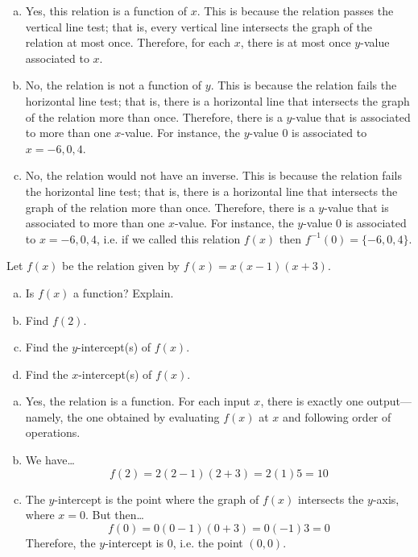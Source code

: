 \documentclass[12pt,letterpaper]{exam}
\begin{document}
\begin{questions}
\sol 
\begin{enumerate}[(a)]
\item Yes, this relation is a function of $x$. This is because the relation passes the vertical line test; that is, every vertical line intersects the graph of the relation at most once. Therefore, for each $x$, there is at most once $y$-value associated to $x$. \pspace

\item No, the relation is not a function of $y$. This is because the relation fails the horizontal line test; that is, there is a horizontal line that intersects the graph of the relation more than once. Therefore, there is a $y$-value that is associated to more than one $x$-value. For instance, the $y$-value $0$ is associated to $x= -6, 0, 4$. \pspace

\item No, the relation would not have an inverse. This is because the relation fails the horizontal line test; that is, there is a horizontal line that intersects the graph of the relation more than once. Therefore, there is a $y$-value that is associated to more than one $x$-value. For instance, the $y$-value $0$ is associated to $x= -6, 0, 4$, i.e. if we called this relation $f(x)$ then $f^{-1}(0)= \{ -6, 0, 4 \}$. 
\end{enumerate}



\newpage
\question[10] Let $f(x)$ be the relation given by $f(x)= x(x - 1)(x + 3)$. 
	\begin{enumerate}[(a)]
	\item Is $f(x)$ a function? Explain. 
	\item Find $f(2)$.
	\item Find the $y$-intercept(s) of $f(x)$. 
	\item Find the $x$-intercept(s) of $f(x)$.
	\end{enumerate} \pspace

\sol 
\begin{enumerate}[(a)]
\item Yes, the relation is a function. For each input $x$, there is exactly one output---namely, the one obtained by evaluating $f(x)$ at $x$ and following order of operations. \pspace

\item We have\dots
	\[
	f(2)= 2(2 - 1)(2 + 3)= 2(1)5= 10
	\] \pspace

\item The $y$-intercept is the point where the graph of $f(x)$ intersects the $y$-axis, where $x= 0$. But then\dots
	\[
	f(0)= 0(0 - 1)(0 + 3)= 0(-1)3= 0
	\]
Therefore, the $y$-intercept is $0$, i.e. the point $(0, 0)$. \pspace


\end{enumerate}
\end{questions}
\end{document}
